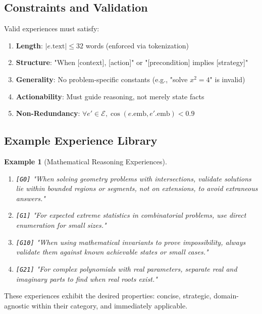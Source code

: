 \documentclass[11pt,letterpaper]{article}
\newtheorem{example}{Example}[section]
\begin{document}
\subsection{Constraints and Validation}

Valid experiences must satisfy:

\begin{enumerate}
    \item \textbf{Length}: $|e.\text{text}| \leq 32$ words (enforced via tokenization)
    \item \textbf{Structure}: "When [context], [action]" or "[precondition] implies [strategy]"
    \item \textbf{Generality}: No problem-specific constants (e.g., "solve $x^2 = 4$" is invalid)
    \item \textbf{Actionability}: Must guide reasoning, not merely state facts
    \item \textbf{Non-Redundancy}: $\forall e' \in \mathcal{E}, \cos(e.\text{emb}, e'.\text{emb}) < 0.9$
\end{enumerate}

\subsection{Example Experience Library}

\begin{example}[Mathematical Reasoning Experiences]
\begin{enumerate}
    \item \texttt{[G0]} "When solving geometry problems with intersections, validate solutions lie within bounded regions or segments, not on extensions, to avoid extraneous answers."
    
    \item \texttt{[G1]} "For expected extreme statistics in combinatorial problems, use direct enumeration for small sizes."
    
    \item \texttt{[G10]} "When using mathematical invariants to prove impossibility, always validate them against known achievable states or small cases."
    
    \item \texttt{[G21]} "For complex polynomials with real parameters, separate real and imaginary parts to find when real roots exist."
\end{enumerate}
\end{example}

These experiences exhibit the desired properties: concise, strategic, domain-agnostic within their category, and immediately applicable.
\end{document}
